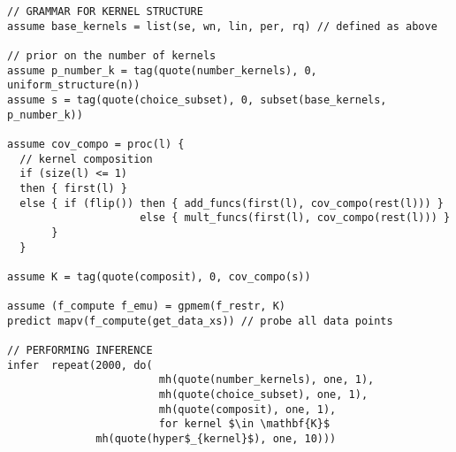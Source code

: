 \begin{minipage}{\linewidth}
\small
\belowcaptionskip=-10pt
\begin{lstlisting}[frame=single,mathescape,label=alg:structureVent,basicstyle=\selectfont\ttfamily,numbers=none]
// GRAMMAR FOR KERNEL STRUCTURE
assume base_kernels = list(se, wn, lin, per, rq) // defined as above

// prior on the number of kernels
assume p_number_k = tag(quote(number_kernels), 0, uniform_structure(n))
assume s = tag(quote(choice_subset), 0, subset(base_kernels, p_number_k))

assume cov_compo = proc(l) {
  // kernel composition
  if (size(l) <= 1)
  then { first(l) }
  else { if (flip()) then { add_funcs(first(l), cov_compo(rest(l))) }
                     else { mult_funcs(first(l), cov_compo(rest(l))) }
       }
  }
                          
assume K = tag(quote(composit), 0, cov_compo(s))

assume (f_compute f_emu) = gpmem(f_restr, K)
predict mapv(f_compute(get_data_xs)) // probe all data points

// PERFORMING INFERENCE  
infer  repeat(2000, do(
                        mh(quote(number_kernels), one, 1),
                        mh(quote(choice_subset), one, 1),
                        mh(quote(composit), one, 1),
                        for kernel $\in \mathbf{K}$ 
			  mh(quote(hyper$_{kernel}$), one, 10)))
\end{lstlisting}

\end{minipage}
